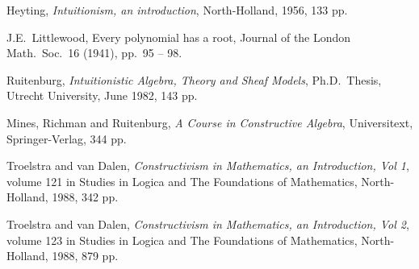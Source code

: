 
\begin{thebibliography}{10}

Heyting, {\em Intuitionism, an introduction}, North-Holland, 1956, 133
pp.

J.E.\ Littlewood,
Every polynomial has a root, Journal of the London Math.\ Soc.\ 16
(1941), pp.\ 95 -- 98.

Ruitenburg, {\em Intuitionistic Algebra, Theory and Sheaf Models},
Ph.D.\ Thesis, Utrecht University, June 1982, 143 pp.

Mines, Richman and Ruitenburg, {\em A Course in Constructive Algebra},
Universitext, Springer-Verlag, 344 pp.

Troelstra and van Dalen, {\em Constructivism in Mathematics, an
Introduction, Vol 1}, volume 121 in Studies in Logica and The
Foundations of Mathematics, North-Holland, 1988, 342 pp.

Troelstra and van Dalen, {\em Constructivism in Mathematics, an
Introduction, Vol 2}, volume 123 in Studies in Logica and The
Foundations of Mathematics, North-Holland, 1988, 879 pp.

\end{thebibliography}


